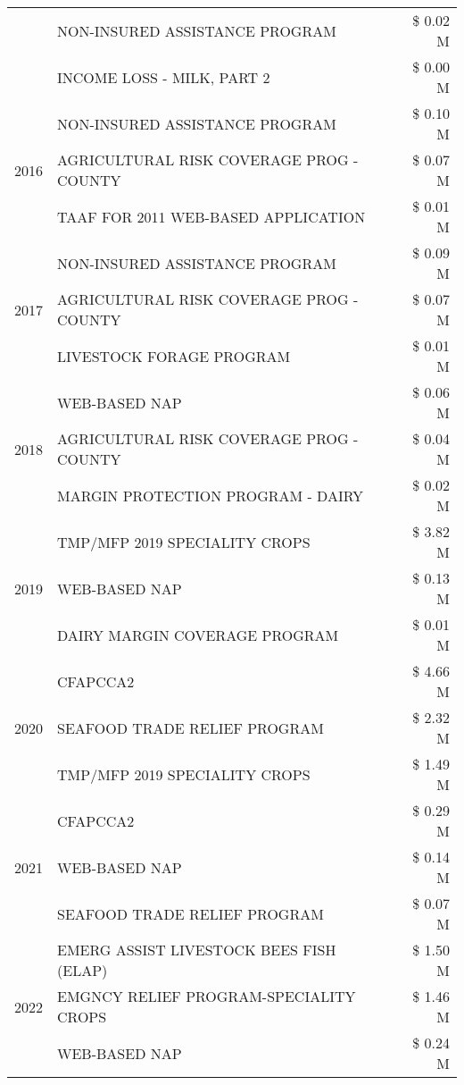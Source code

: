 \begin{tabular}{llr}
 & NON-INSURED ASSISTANCE PROGRAM & \$ 0.02 M \\
 & INCOME LOSS - MILK, PART 2 & \$ 0.00 M \\
\cline{1-3}
\multirow[t]{3}{*}{2016} & NON-INSURED ASSISTANCE PROGRAM & \$ 0.10 M \\
 & AGRICULTURAL RISK COVERAGE PROG - COUNTY & \$ 0.07 M \\
 & TAAF FOR 2011 WEB-BASED APPLICATION & \$ 0.01 M \\
\cline{1-3}
\multirow[t]{3}{*}{2017} & NON-INSURED ASSISTANCE PROGRAM & \$ 0.09 M \\
 & AGRICULTURAL RISK COVERAGE PROG - COUNTY & \$ 0.07 M \\
 & LIVESTOCK FORAGE PROGRAM & \$ 0.01 M \\
\cline{1-3}
\multirow[t]{3}{*}{2018} & WEB-BASED NAP & \$ 0.06 M \\
 & AGRICULTURAL RISK COVERAGE PROG - COUNTY & \$ 0.04 M \\
 & MARGIN PROTECTION PROGRAM - DAIRY & \$ 0.02 M \\
\cline{1-3}
\multirow[t]{3}{*}{2019} & TMP/MFP 2019 SPECIALITY CROPS & \$ 3.82 M \\
 & WEB-BASED NAP & \$ 0.13 M \\
 & DAIRY MARGIN COVERAGE PROGRAM & \$ 0.01 M \\
\cline{1-3}
\multirow[t]{3}{*}{2020} & CFAPCCA2 & \$ 4.66 M \\
 & SEAFOOD TRADE RELIEF PROGRAM & \$ 2.32 M \\
 & TMP/MFP 2019 SPECIALITY CROPS & \$ 1.49 M \\
\cline{1-3}
\multirow[t]{3}{*}{2021} & CFAPCCA2 & \$ 0.29 M \\
 & WEB-BASED NAP & \$ 0.14 M \\
 & SEAFOOD TRADE RELIEF PROGRAM & \$ 0.07 M \\
\cline{1-3}
\multirow[t]{3}{*}{2022} & EMERG ASSIST LIVESTOCK BEES FISH (ELAP) & \$ 1.50 M \\
 & EMGNCY RELIEF PROGRAM-SPECIALITY CROPS & \$ 1.46 M \\
 & WEB-BASED NAP & \$ 0.24 M \\
\cline{1-3}
\bottomrule
\end{tabular}
